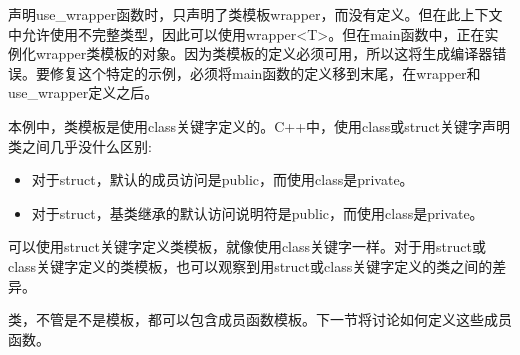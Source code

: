 声明use\_wrapper函数时，只声明了类模板wrapper，而没有定义。但在此上下文中允许使用不完整类型，因此可以使用wrapper<T>。但在main函数中，正在实例化wrapper类模板的对象。因为类模板的定义必须可用，所以这将生成编译器错误。要修复这个特定的示例，必须将main函数的定义移到末尾，在wrapper和use\_wrapper定义之后。

本例中，类模板是使用class关键字定义的。C++中，使用class或struct关键字声明类之间几乎没什么区别:

\begin{itemize}
\item 
对于struct，默认的成员访问是public，而使用class是private。

\item 
对于struct，基类继承的默认访问说明符是public，而使用class是private。
\end{itemize}

可以使用struct关键字定义类模板，就像使用class关键字一样。对于用struct或class关键字定义的类模板，也可以观察到用struct或class关键字定义的类之间的差异。

类，不管是不是模板，都可以包含成员函数模板。下一节将讨论如何定义这些成员函数。

















